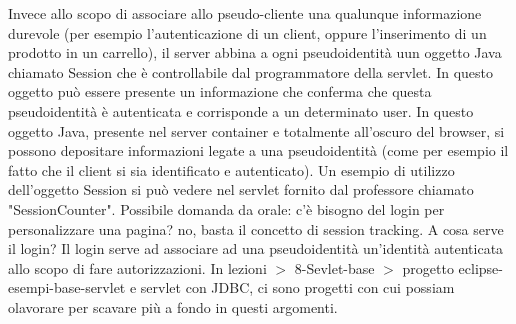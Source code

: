 Invece allo scopo di associare allo pseudo-cliente una qualunque informazione durevole (per esempio l'autenticazione di un client, oppure l'inserimento di un prodotto in un carrello), il server abbina a ogni pseudoidentità uun oggetto Java chiamato Session che è controllabile dal programmatore della servlet. In questo oggetto può essere presente un informazione che conferma che questa pseudoidentità è autenticata e corrisponde a un determinato user. In questo oggetto Java, presente nel server container e totalmente all'oscuro del browser, si possono depositare informazioni legate a una pseudoidentità (come per esempio il fatto che il client si sia identificato e autenticato).\newline
Un esempio di utilizzo dell'oggetto Session si può vedere nel servlet fornito dal professore chiamato "SessionCounter".\newline
\newline
Possibile domanda da orale: c'è bisogno del login per personalizzare una pagina? no, basta il concetto di session tracking. A cosa serve il login? Il login serve ad associare ad una pseudoidentità un'identità autenticata allo scopo di fare autorizzazioni.\newline
\newline
In lezioni $>$ 8-Sevlet-base $>$ progetto eclipse-esempi-base-servlet e servlet con JDBC, ci sono progetti con cui possiam olavorare per scavare più a fondo in questi argomenti.